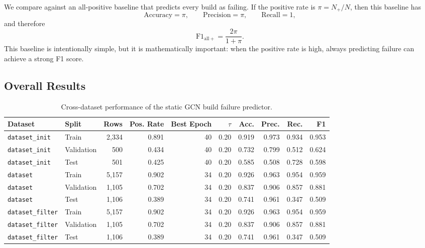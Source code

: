 We compare against an all-positive baseline that predicts every build as failing. If the positive rate is $\pi=N_+/N$, then this baseline has
\[
\text{Accuracy}=\pi,\qquad
\text{Precision}=\pi,\qquad
\text{Recall}=1,
\]
and therefore
\[
\text{F1}_{\mathrm{all+}}=\frac{2\pi}{1+\pi}.
\]
This baseline is intentionally simple, but it is mathematically important: when the positive rate is high, always predicting failure can achieve a strong F1 score.

\subsection{Overall Results}

\begin{table}[ht]
    \centering
    \caption{Cross-dataset performance of the static GCN build failure predictor.}
    \label{tab:cross_dataset_results}
    \begin{tabular}{llrrrrrrrr}
        \toprule
        Dataset & Split & Rows & Pos. Rate & Best Epoch & $\tau$ & Acc. & Prec. & Rec. & F1 \\
        \midrule
        \texttt{dataset\_init} & Train & 2,334 & 0.891 & 40 & 0.20 & 0.919 & 0.973 & 0.934 & 0.953 \\
        \texttt{dataset\_init} & Validation & 500 & 0.434 & 40 & 0.20 & 0.732 & 0.799 & 0.512 & 0.624 \\
        \texttt{dataset\_init} & Test & 501 & 0.425 & 40 & 0.20 & 0.585 & 0.508 & 0.728 & 0.598 \\
        \midrule
        \texttt{dataset} & Train & 5,157 & 0.902 & 34 & 0.20 & 0.926 & 0.963 & 0.954 & 0.959 \\
        \texttt{dataset} & Validation & 1,105 & 0.702 & 34 & 0.20 & 0.837 & 0.906 & 0.857 & 0.881 \\
        \texttt{dataset} & Test & 1,106 & 0.389 & 34 & 0.20 & 0.741 & 0.961 & 0.347 & 0.509 \\
        \midrule
        \texttt{dataset\_filter} & Train & 5,157 & 0.902 & 34 & 0.20 & 0.926 & 0.963 & 0.954 & 0.959 \\
        \texttt{dataset\_filter} & Validation & 1,105 & 0.702 & 34 & 0.20 & 0.837 & 0.906 & 0.857 & 0.881 \\
        \texttt{dataset\_filter} & Test & 1,106 & 0.389 & 34 & 0.20 & 0.741 & 0.961 & 0.347 & 0.509 \\
        \bottomrule
    \end{tabular}
\end{table}

